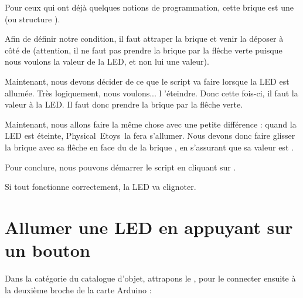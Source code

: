 \documentclass[french]{etoys-guide}
\def\appName{Physical~Etoys~}
\begin{document}
Pour ceux qui ont déjà quelques notions de programmation, cette brique est une
 (ou structure ).


Afin de définir notre condition, il faut attraper la brique  et
venir la déposer à côté de  (attention, il ne faut pas prendre
la brique par la  flêche verte puisque nous voulons
 la valeur de la LED, et non lui  une
valeur).


Maintenant, nous devons décider de ce que le script va faire lorsque la LED est
allumée. Très logiquement, nous voulons... l 'éteindre. Donc cette fois-ci, il
faut  la valeur  à la LED. Il faut donc prendre
la brique  par la  flêche verte.



Maintenant, nous allons faire la même chose avec une petite différence : quand
la LED est éteinte, \appName la fera s'allumer.  Nous devons donc faire
glisser la brique  avec sa  flêche en face du
 de la brique \testtile{}, en s'assurant que sa valeur est
.


Pour conclure, nous pouvons démarrer le script en cliquant sur
.


Si tout fonctionne correctement, la LED va clignoter.

\section{Allumer une LED en appuyant sur un bouton}


Dans la catégorie  du catalogue d'objet, attrapons le
, pour le connecter ensuite à la deuxième broche de
la carte Arduino :


\end{document}

